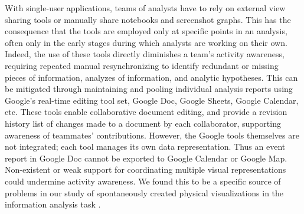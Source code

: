 With single-user applications, teams of analysts have to rely on external view sharing tools \citep{Greenberg1990} or manually share notebooks and screenshot graphs. This has the consequence that the tools are employed only at specific points in an analysis, often only in the early stages during which analysts are working on their own. Indeed, the use of these tools directly diminishes a team’s activity awareness, requiring repeated manual resynchronizing to identify redundant or missing pieces of information, analyzes of information, and analytic hypotheses. This can be mitigated through maintaining and pooling individual analysis reports using Google’s real-time editing tool set, Google Doc, Google Sheets, Google Calendar, etc. These tools enable collaborative document editing, and provide a revision history list of changes made to a document by each collaborator, supporting awareness of teammates’ contributions. However, the Google tools themselves are not integrated; each tool manages its own data representation. Thus an event report in Google Doc cannot be exported to Google Calendar or Google Map. Non-existent or weak support for coordinating multiple visual representations could undermine activity awareness. We found this to be a specific source of problems in our study of spontaneously created physical visualizations in the information analysis task \citep{Carroll2013}.

